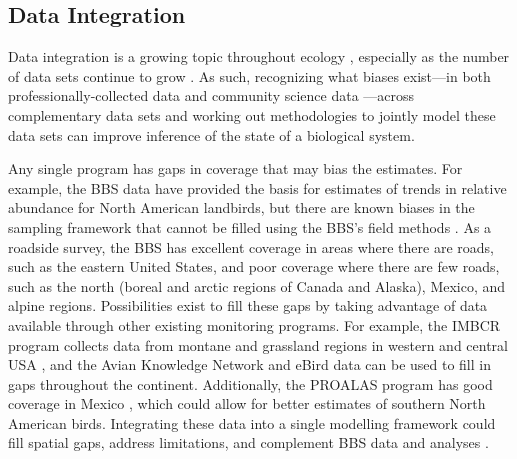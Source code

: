 \subsection{Data Integration}

\par Data integration is a growing topic throughout ecology \citep{isaac_data_2020, miller_recent_2019, pacifici_integrating_2017, boersch-supan_integrating_2021}, especially as the number of data sets continue to grow \citep{binley_minimizing_2023}.
As such, recognizing what biases exist---in both professionally-collected data and community science data \citep{binley_data_2023}---across complementary data sets and working out methodologies to jointly model these data sets can improve inference of the state of a biological system.

\par Any single program has gaps in coverage that may bias the estimates. 
For example, the BBS data have provided the basis for estimates of trends in relative abundance for North American landbirds, but there are known biases in the sampling framework that cannot be filled using the BBS’s field methods \citep{thogmartin_sensitivity_2010, solymos_lessons_2020, us_geological_survey_strategic_2020}. 
As a roadside survey, the BBS has excellent coverage in areas where there are roads, such as the eastern United States, and poor coverage where there are few roads, such as the north (boreal and arctic regions of Canada and Alaska), Mexico, and alpine regions. 
Possibilities exist to fill these gaps by taking advantage of data available through other existing monitoring programs. 
For example, the IMBCR program collects data from montane and grassland regions in western and central USA \citep{pavlacky_statistically_2017}, and the Avian Knowledge Network \citep{iliff_avian_2009} and eBird data \citep{sullivan_ebird_2014} can be used to fill in gaps throughout the continent. 
Additionally, the PROALAS program has good coverage in Mexico \citep{ruiz_gutierrez_proalas_2020}, which could allow for better estimates of southern North American birds. 
Integrating these data into a single modelling framework could fill spatial gaps, address limitations, and complement BBS data and analyses \citep{miller_recent_2019, isaac_data_2020}.

